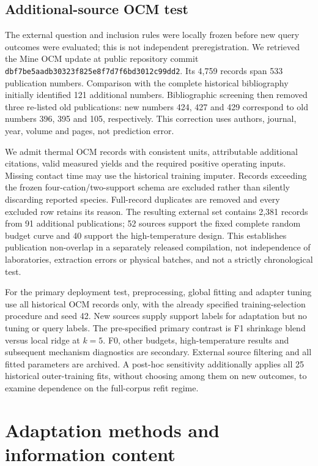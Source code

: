 \documentclass[11pt]{article}
\begin{document}
\subsection{Additional-source OCM test}
The external question and inclusion rules were locally frozen before new query outcomes were evaluated; this is not independent preregistration. We retrieved the Mine OCM update \cite{mine} at public repository commit \texttt{dbf7be5aadb30323f825e8f7d7f6bd3012c99dd2}. Its 4,759 records span 533 publication numbers. Comparison with the complete historical bibliography initially identified 121 additional numbers. Bibliographic screening then removed three re-listed old publications: new numbers 424, 427 and 429 correspond to old numbers 396, 395 and 105, respectively. This correction uses authors, journal, year, volume and pages, not prediction error.

We admit thermal OCM records with consistent units, attributable additional citations, valid measured yields and the required positive operating inputs. Missing contact time may use the historical training imputer. Records exceeding the frozen four-cation/two-support schema are excluded rather than silently discarding reported species. Full-record duplicates are removed and every excluded row retains its reason. The resulting external set contains 2,381 records from 91 additional publications; 52 sources support the fixed complete random budget curve and 40 support the high-temperature design. This establishes publication non-overlap in a separately released compilation, not independence of laboratories, extraction errors or physical batches, and not a strictly chronological test.

For the primary deployment test, preprocessing, global fitting and adapter tuning use all historical OCM records only, with the already specified training-selection procedure and seed 42. New sources supply support labels for adaptation but no tuning or query labels. The pre-specified primary contrast is F1 shrinkage blend versus local ridge at $k=5$. F0, other budgets, high-temperature results and subsequent mechanism diagnostics are secondary. External source filtering and all fitted parameters are archived. A post-hoc sensitivity additionally applies all 25 historical outer-training fits, without choosing among them on new outcomes, to examine dependence on the full-corpus refit regime.

\section{Adaptation methods and information content}
\end{document}

